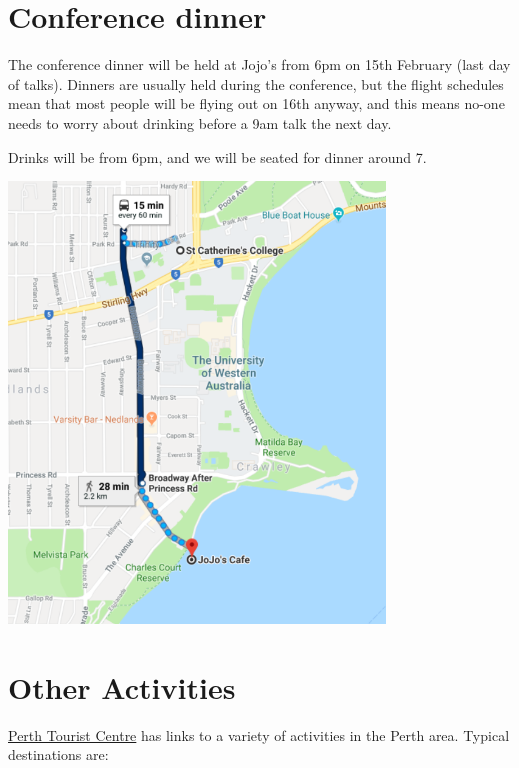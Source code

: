\documentclass[]{article}
\begin{document}
\section{Conference dinner}\label{conference-dinner}

The conference dinner will be held at Jojo's from 6pm on 15th February
(last day of talks). Dinners are usually held during the conference, but
the flight schedules mean that most people will be flying out on 16th
anyway, and this means no-one needs to worry about drinking before a 9am
talk the next day.

Drinks will be from 6pm, and we will be seated for dinner around 7.

\begin{center}
\includegraphics[width=10cm]{images/Dinner.png}
\end{center}

\section{Other Activities}\label{other-activities}

\href{http://perthtouristcentre.com.au}{Perth Tourist Centre} has links
to a variety of activities in the Perth area. Typical destinations are:
\end{document}
